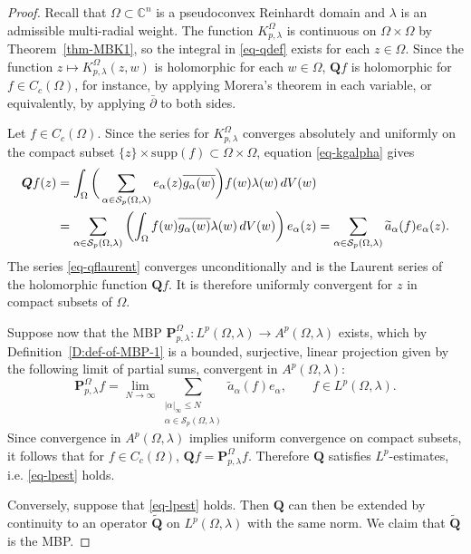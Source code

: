 \documentclass[10pt,a4paper]{amsart}
\newcommand{\C}{{\mathbb C}}
\newcommand{\abs}[1]{\left\vert#1\right\vert}
\newcommand{\cs}{{\mathcal S}}
\newcommand{\dbar}{\bar \partial}
\newcommand{\ol}{\overline}
\newcommand{\wt}{\widetilde}
\begin{document}
\begin{proof} Recall that  $\Omega \subset \C^n$ is a pseudoconvex Reinhardt domain and $\lambda$ is an admissible multi-radial weight. 
The function $K_{p,\lambda}^\Omega$ is continuous on $\Omega\times \Omega$ by Theorem~\ref{thm-MBK1}, 
so the integral in \eqref{eq-qdef} exists for each $z\in \Omega$. 
Since the function $z \mapsto K_{p,\lambda}^\Omega(z, w)$ is holomorphic for each $w \in \Omega$, $\bm{Q}f$ is holomorphic for $f\in C_c(\Omega)$, for instance, by applying Morera's theorem in each variable, or equivalently, by applying $\dbar$ to both sides.

Let $f\in C_c(\Omega)$. 
Since the series for $K_{p,\lambda}^\Omega$ converges absolutely and uniformly on the compact subset $\{z\}\times \mathrm{supp}(f) \subset \Omega\times \Omega$, equation \eqref{eq-kgalpha} gives
\begin{align}
\bm{Q}f(z) &= \int_\Omega \bigg(\sum_{\alpha \in \cs_p(\Omega,\lambda)} e_\alpha(z)\ol{g_\alpha(w)}\bigg)f(w)\lambda(w)\,dV(w) \notag \\
&=\sum_{\alpha \in \cs_p(\Omega,\lambda)} \left( \int_\Omega f(w)  \ol{g_\alpha(w)}\lambda(w)\,dV(w)\right)e_\alpha(z)
=\sum_{\alpha \in \cs_p(\Omega,\lambda)} \wt{a}_\alpha(f) e_\alpha(z). \label{eq-qflaurent}
\end{align}
The series \eqref{eq-qflaurent} converges unconditionally and is the Laurent series of the holomorphic function $\bm{Q}f$. It is therefore uniformly convergent for $z$ in compact subsets of $\Omega$.

Suppose now that the MBP $\bm{P}_{p,\lambda}^\Omega:L^p(\Omega, \lambda)\to A^p(\Omega, \lambda) $ exists, which by Definition~\ref{D:def-of-MBP-1} is a bounded, surjective, linear projection given by the following limit of partial sums, convergent in $A^p(\Omega,\lambda)$:
\begin{equation}\label{eq-sqpartialsums} 
\bm{P}_{p,\lambda}^\Omega f = \lim_{N\to \infty} \sum_{\substack{\abs{\alpha}_\infty\leq N\\\alpha\in \cs_p(\Omega,\lambda) }}\wt{a}_\alpha(f) e_\alpha, \qquad f \in L^p(\Omega,\lambda).
\end{equation}
Since convergence in $A^p(\Omega,\lambda)$ implies uniform convergence on compact subsets, it follows that for $f \in C_c(\Omega)$, $\bm{Q}f = \bm{P}_{p,\lambda}^\Omega f$. 
Therefore $\bm{Q}$ satisfies $L^p$-estimates, i.e. \eqref{eq-lpest} holds.

Conversely, suppose that \eqref{eq-lpest} holds.  
Then $\bm{Q}$ can then be extended by continuity to an operator $\wt{\bm{Q}}$ on $L^p(\Omega, \lambda)$ with the same norm. 
We claim that $\wt{\bm{Q}}$ is the MBP.


\end{proof}
\end{document}
